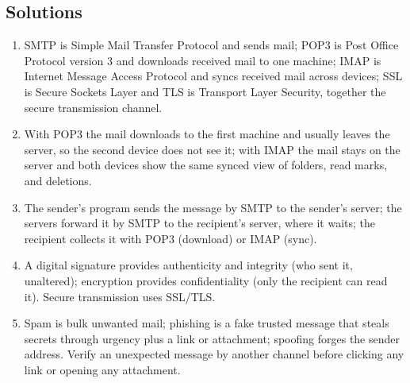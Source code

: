 \documentclass[11pt]{article}
\begin{document}
\subsection*{Solutions}
\begingroup\small
\begin{enumerate}[label=\arabic*.]
  \item SMTP is Simple Mail Transfer Protocol and sends mail; POP3 is Post
    Office Protocol version 3 and downloads received mail to one machine;
    IMAP is Internet Message Access Protocol and syncs received mail across
    devices; SSL is Secure Sockets Layer and TLS is Transport Layer
    Security, together the secure transmission channel.
  \item With POP3 the mail downloads to the first machine and usually
    leaves the server, so the second device does not see it; with IMAP the
    mail stays on the server and both devices show the same synced view of
    folders, read marks, and deletions.
  \item The sender's program sends the message by SMTP to the sender's
    server; the servers forward it by SMTP to the recipient's server, where
    it waits; the recipient collects it with POP3 (download) or IMAP
    (sync).
  \item A digital signature provides authenticity and integrity (who sent
    it, unaltered); encryption provides confidentiality (only the recipient
    can read it). Secure transmission uses SSL/TLS.
  \item Spam is bulk unwanted mail; phishing is a fake trusted message
    that steals secrets through urgency plus a link or attachment;
    spoofing forges the sender address. Verify an unexpected message by
    another channel before clicking any link or opening any attachment.
\end{enumerate}
\endgroup
\end{document}
